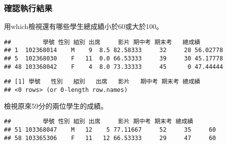 \documentclass[
]{book}
\newenvironment{Shaded}{\begin{snugshade}}{\end{snugshade}}
\newcommand{\DecValTok}[1]{\textcolor[rgb]{0.00,0.00,0.81}{#1}}
\newcommand{\FunctionTok}[1]{\textcolor[rgb]{0.00,0.00,0.00}{#1}}
\newcommand{\NormalTok}[1]{#1}
\newcommand{\SpecialCharTok}[1]{\textcolor[rgb]{0.00,0.00,0.00}{#1}}
\newcommand{\StringTok}[1]{\textcolor[rgb]{0.31,0.60,0.02}{#1}}
\begin{document}
\hypertarget{ux78baux8a8dux57f7ux884cux7d50ux679c}{%
\subsubsection{確認執行結果}\label{ux78baux8a8dux57f7ux884cux7d50ux679c}}

用which檢視還有哪些學生總成績小於60或大於100。

\begin{Shaded}
\end{Shaded}

\begin{verbatim}
##         學號 性別 組別 出席     影片 期中考 期末考   總成績
## 1  102368014    M    9  8.5 82.58333     32     28 56.02778
## 5  102368030    F   11  0.0 66.53333     39     30 45.17778
## 48 103368042    F    4  8.0 73.33333     45      0 47.44444
\end{verbatim}

\begin{Shaded}
\end{Shaded}

\begin{verbatim}
## [1] 學號   性別   組別   出席   影片   期中考 期末考 總成績
## <0 rows> (or 0-length row.names)
\end{verbatim}

檢視原來59分的兩位學生的成績。

\begin{Shaded}
\end{Shaded}

\begin{verbatim}
##         學號 性別 組別 出席     影片 期中考 期末考 總成績
## 51 103368047    M   12    5 77.11667     52     35     60
## 58 103365306    F   11   12 66.53333     29     47     60
\end{verbatim}
\end{document}
